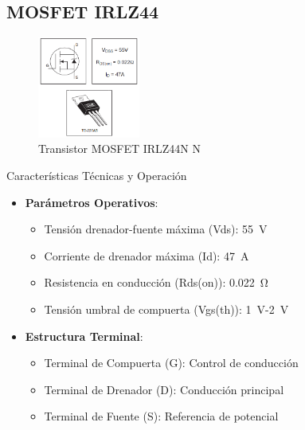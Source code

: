 \subsection{MOSFET IRLZ44}
\begin{figure}[H]
	\centering
	\includegraphics[width=0.3\textwidth]{images/mosfet}
	\caption{Transistor MOSFET IRLZ44N N}
	\label{fig:mosfet}
\end{figure}
\begin{componentBox}{Características Técnicas y Operación \citep{infineon2020irlz44}}
	\begin{itemize}[leftmargin=*,itemsep=1pt,parsep=1pt]
		\item \textbf{Parámetros Operativos}:
		\begin{itemize}[itemsep=0pt,parsep=0pt]
			\item Tensión drenador-fuente máxima (Vds): \SI{55}{\volt}
			\item Corriente de drenador máxima (Id): \SI{47}{\ampere}
			\item Resistencia en conducción (Rds(on)): \SI{0.022}{\ohm}
			\item Tensión umbral de compuerta (Vgs(th)): \SI{1}{\volt}-\SI{2}{\volt}
		\end{itemize}
		\item \textbf{Estructura Terminal}:
		\begin{itemize}[itemsep=0pt,parsep=0pt]
			\item Terminal de Compuerta (G): Control de conducción
			\item Terminal de Drenador (D): Conducción principal
			\item Terminal de Fuente (S): Referencia de potencial
		\end{itemize}
	\end{itemize}
\end{componentBox}

